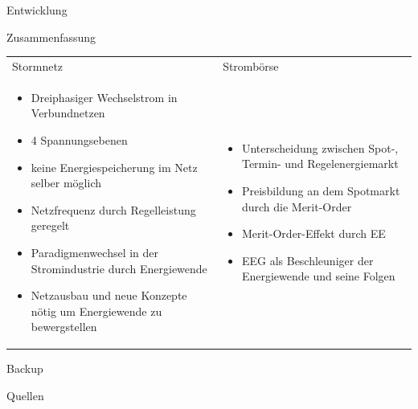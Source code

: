 \documentclass[aspectratio=1610, professionalfonts, 9pt]{beamer}
\begin{document}
\begin{frame}{Entwicklung}

\end{frame}



\begin{frame}{Zusammenfassung}
\begin{tabular}{p{}p{}}
   Stormnetz  &         Strombörse\\
\begin{itemize}
  \item Dreiphasiger Wechselstrom in Verbundnetzen
  \item 4 Spannungsebenen
  \item keine Energiespeicherung im Netz selber möglich
  \item Netzfrequenz durch Regelleistung geregelt
  \item Paradigmenwechsel in der Stromindustrie durch Energiewende
  \item Netzausbau und neue Konzepte nötig um Energiewende zu bewergstellen
\end{itemize}

&
\begin{itemize}
  \item Unterscheidung zwischen Spot-, Termin- und Regelenergiemarkt
  \item Preisbildung an dem Spotmarkt durch die Merit-Order
  \item Merit-Order-Effekt durch EE
  \item EEG als Beschleuniger der Energiewende und seine Folgen
\end{itemize}

\end{tabular}
\end{frame}


\begin{frame}{Backup}

\end{frame}
\begin{frame}{Quellen}

\end{frame}
%
\end{document}
